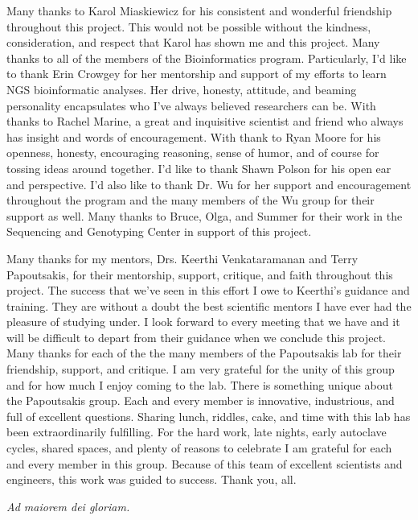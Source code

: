 Many thanks to Karol Miaskiewicz for his consistent and wonderful friendship throughout this project. This would not be possible without the kindness, consideration, and respect that Karol has shown me and this project. Many thanks to all of the members of the Bioinformatics program. Particularly, I'd like to thank Erin Crowgey for her mentorship and support of my efforts to learn NGS bioinformatic analyses. Her drive, honesty, attitude, and beaming personality encapsulates who I've always believed researchers can be. With thanks to Rachel Marine, a great and inquisitive scientist and friend who always has insight and words of encouragement. With thank to Ryan Moore for his openness, honesty, encouraging reasoning, sense of humor, and of course for tossing ideas around together. I'd like to thank Shawn Polson for his open ear and perspective. I'd also like to thank Dr. Wu for her support and encouragement throughout the program and the many members of the Wu group for their support as well. Many thanks to Bruce, Olga, and Summer for their work in the Sequencing and Genotyping Center in support of this project.

Many thanks for my mentors, Drs. Keerthi Venkataramanan and Terry Papoutsakis, for their mentorship, support, critique, and faith throughout this project. The success that we've seen in this effort I owe to Keerthi's guidance and training. They are without a doubt the best scientific mentors I have ever had the pleasure of studying under. I look forward to every meeting that we have and it will be difficult to depart from their guidance when we conclude this project.
Many thanks for each of the the many members of the Papoutsakis lab for their friendship, support, and critique. I am very grateful for the unity of this group and for how much I enjoy coming to the lab. There is something unique about the Papoutsakis group. Each and every member is innovative, industrious, and full of excellent questions. Sharing lunch, riddles, cake, and time with this lab has been extraordinarily fulfilling. For the hard work, late nights, early autoclave cycles, shared spaces, and plenty of reasons to celebrate I am grateful for each and every member in this group. Because of this team of excellent scientists and engineers, this work was guided to success. Thank you, all.

{\centerline {\it Ad maiorem dei gloriam.}}